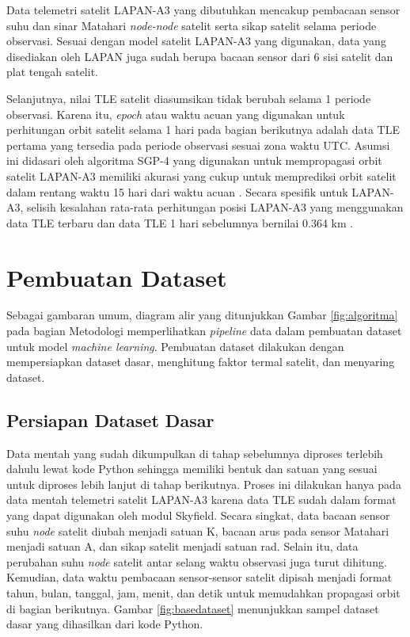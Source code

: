 Data telemetri satelit LAPAN-A3 yang dibutuhkan mencakup pembacaan sensor suhu
dan sinar Matahari \textit{node-node} satelit serta sikap satelit selama
periode observasi. Sesuai dengan model satelit LAPAN-A3 yang digunakan, data
yang disediakan oleh LAPAN juga sudah berupa bacaan sensor dari 6 sisi satelit
dan plat tengah satelit.

Selanjutnya, nilai TLE satelit diasumsikan tidak berubah selama 1 periode
observasi. Karena itu, \textit{epoch} atau waktu acuan yang digunakan untuk
perhitungan orbit satelit selama 1 hari pada bagian berikutnya adalah data TLE
pertama yang tersedia pada periode observasi sesuai zona waktu UTC. Asumsi ini
didasari oleh algoritma SGP-4 yang digunakan untuk mempropagasi orbit satelit
LAPAN-A3 memiliki akurasi yang cukup untuk memprediksi orbit satelit dalam
rentang waktu 15 hari dari waktu acuan \cite{kelsoa}. Secara spesifik untuk
LAPAN-A3, selisih kesalahan rata-rata perhitungan posisi LAPAN-A3 yang
menggunakan data TLE terbaru dan data TLE 1 hari sebelumnya bernilai 0.364 km
\cite{nugroho2018}. 

\section{Pembuatan Dataset}

Sebagai gambaran umum, diagram alir yang ditunjukkan Gambar \ref{fig:algoritma}
pada bagian Metodologi memperlihatkan \textit{pipeline} data dalam pembuatan
dataset untuk model \textit{machine learning}. Pembuatan dataset dilakukan
dengan mempersiapkan dataset dasar, menghitung faktor termal satelit, dan
menyaring dataset.

\subsection{Persiapan Dataset Dasar}

Data mentah yang sudah dikumpulkan di tahap sebelumnya diproses terlebih dahulu
lewat kode Python sehingga memiliki bentuk dan satuan yang sesuai untuk
diproses lebih lanjut di tahap berikutnya. Proses ini dilakukan hanya pada data
mentah telemetri satelit LAPAN-A3 karena data TLE sudah dalam format yang dapat
digunakan oleh modul Skyfield. Secara singkat, data bacaan sensor suhu
\textit{node} satelit diubah menjadi satuan K, bacaan arus pada sensor Matahari
menjadi satuan A, dan sikap satelit menjadi satuan rad. Selain itu, data
perubahan suhu \textit{node} satelit antar selang waktu observasi juga turut
dihitung. Kemudian, data waktu pembacaan sensor-sensor satelit dipisah menjadi
format tahun, bulan, tanggal, jam, menit, dan detik untuk memudahkan propagasi
orbit di bagian berikutnya. Gambar \ref{fig:basedataset} menunjukkan
sampel dataset dasar yang dihasilkan dari kode Python.

